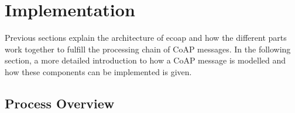 





\section{Implementation}

Previous sections explain the architecture of ecoap and how the different parts work together to fulfill the processing chain of CoAP messages. In the following section, a more detailed introduction to how a CoAP message is modelled and how these components can be implemented is given.

\subsection{Process Overview}

